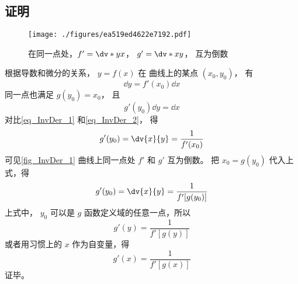 \subsection{证明}
\begin{figure}[ht]
\centering
\texttt{[image: ./figures/ea519ed4622e7192.pdf]}
\caption{在同一点处，$f'=\dv*{y}{x}$， $g'=\dv*{x}{y}$， 互为倒数}\label{fig_InvDer_1}
\end{figure}
根据导数和微分的关系， $y = f(x)$ 在 曲线上的某点 $(x_0, y_0)$， 有
 \begin{equation}\label{eq_InvDer_1}
\dd{y} = f'(x_0) \dd{x}
\end{equation}
同一点也满足 $g(y_0) = x_0$， 且
 \begin{equation}\label{eq_InvDer_2}
g'(y_0)\dd{y} = \dd{x}
\end{equation}
对比\autoref{eq_InvDer_1} 和\autoref{eq_InvDer_2}， 得
\begin{equation}
g'(y_0) = \dv{x}{y} = \frac{1}{f'(x_0)}
\end{equation}
可见\autoref{fig_InvDer_1} 曲线上同一点处 $f'$ 和 $g'$ 互为倒数。 把 ${x_0} = g(y_0)$ 代入上式，得
\begin{equation}
g'(y_0) = \dv{x}{y} = \frac{1}{f'[g(y_0)]}
\end{equation} 
上式中， $y_0$ 可以是 $g$ 函数定义域的任意一点，所以
\begin{equation}
g'(y) = \frac{1}{f'[g(y)]}
\end{equation} 
或者用习惯上的 $x$ 作为自变量，得
\begin{equation}
g'(x) = \frac{1}{f'[g(x)]}
\end{equation}
证毕。
















